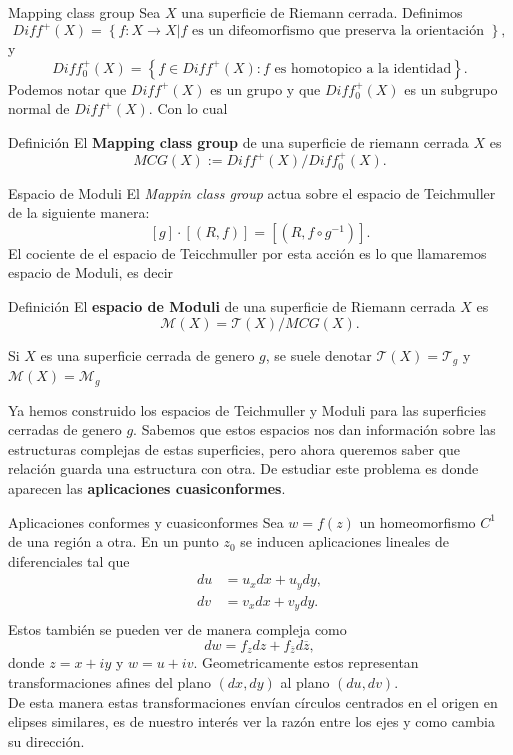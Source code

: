 \documentclass[xcolor=dvipsnames,10pt]{beamer}
\begin{document}
    \begin{frame}{Mapping class group}
        Sea $X$ una superficie de Riemann cerrada. Definimos
        $$Diff^+(X)=\left\{f:X\to X| f \text{ es un difeomorfismo que preserva la orientación }\right\},$$
        y
        $$Diff^+_0(X)=\left\{f\in Diff^+(X):f\text{ es homotopico a la identidad}\right\}.$$
        Podemos notar que $Diff^+(X)$ es un grupo y que $Diff^+_0(X)$ es un subgrupo normal de $Diff^+(X).$ Con lo cual 
        \begin{block}{Definición}
            El \textbf{Mapping class group} de una superficie de riemann cerrada $X$ es
            $$MCG(X):=Diff^+(X)/Diff^+_0(X).$$
        \end{block}
        
    \end{frame}
    \begin{frame}{Espacio de Moduli}
        El \textit{Mappin class group} actua sobre el espacio de Teichmuller de la siguiente manera:
        $$[g]\cdot[(R,f)]=[(R,f\circ g^{-1})].$$
        El cociente de el espacio de Teicchmuller por esta acción es lo que llamaremos espacio de Moduli, es decir
        \begin{block}{Definición}
            El \textbf{espacio de Moduli} de una superficie de Riemann cerrada $X$ es
            $$\mathcal{M}(X)=\mathcal{T}(X)/MCG(X).$$
        \end{block}
        Si $X$ es una superficie cerrada de genero $g$, se suele denotar $\mathcal{T}(X)=\mathcal{T}_g$ y $\mathcal{M}(X)=\mathcal{M}_g$
    \end{frame}
    \begin{frame}
        Ya hemos construido los espacios de Teichmuller y Moduli para las superficies cerradas de genero $g$. Sabemos que estos espacios nos dan información sobre las estructuras complejas de estas superficies, pero ahora queremos saber que relación guarda una estructura con otra. De estudiar este problema es donde aparecen las \textbf{aplicaciones cuasiconformes}.
    \end{frame}

    

\begin{frame}{Aplicaciones conformes y cuasiconformes}
Sea $w=f(z)$ un homeomorfismo $C^1$ de una región a otra. En un punto $z_0$ se inducen aplicaciones lineales de diferenciales tal que
\begin{align*}
    du&=u_xdx+u_ydy,\\
    dv&=v_xdx+v_ydy.\\
\end{align*}
Estos también se pueden ver de manera compleja como
$$dw=f_zdz+f_{\overline{z}}d\overline{z},$$
donde $z=x+iy$ y $w=u+iv.$ Geometricamente  estos representan transformaciones afines del plano $(dx,dy)$ al plano
$(du,dv).$\\

De esta manera estas transformaciones envían círculos centrados en el origen en elipses similares, es de nuestro interés ver la razón entre los ejes y como cambia su dirección.    
\end{frame}
\end{document}
